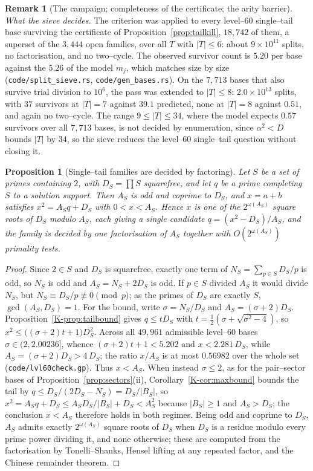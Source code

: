 \documentclass[11pt]{article}
\newtheorem{proposition}[theorem]{Proposition}
\theoremstyle{definition}
\newtheorem{remark}[theorem]{Remark}
\begin{document}
\begin{remark}[The campaign; completeness of the certificate; the arity barrier]
\emph{What the sieve decides.} The criterion was applied to every level--$60$ single--tail base surviving the certificate of
Proposition~\ref{prop:tailkill}, $18{,}742$ of them, a superset of the $3{,}444$ open families, over
all $T$ with $|T|\le6$: about $9\times10^{11}$ splits, no factorisation, and no two--cycle. The
observed survivor count is $5.20$ per base against the $5.26$ of the model $m_j$, which matches size by size
\textup{(\texttt{code/split\_sieve.rs}, \texttt{code/gen\_bases.rs})}. On the $7{,}713$ bases that also
survive trial division to $10^{6}$, the pass was extended to $|T|\le8$: $2.0\times10^{13}$ splits,
with $37$ survivors at $|T|=7$ against $39.1$ predicted, none at $|T|=8$ against $0.51$, and again no two--cycle. The range
$9\le|T|\le34$, where the model expects $0.57$ survivors over all $7{,}713$ bases, is not decided by enumeration, since
$\alpha^{2}<D$ bounds $|T|$ by $34$, so the sieve reduces the level--$60$ single--tail question without closing it.


\begin{proposition}[Single--tail families are decided by factoring]\label{prop:lvl60factor}
Let $S$ be a set of primes containing $2$, with $D_S=\prod S$ squarefree, and let $q$ be a prime
completing $S$ to a solution support. Then $A_S$ is odd and coprime to $D_S$, and $x=a+b$ satisfies
$x^2=A_Sq+D_S$ with $0<x<A_S$. Hence $x$ is one of the $2^{\omega(A_S)}$ square roots of $D_S$ modulo
$A_S$, each giving a single candidate $q=(x^2-D_S)/A_S$, and the family is decided by one
factorisation of $A_S$ together with $O(2^{\omega(A_S)})$ primality tests.
\end{proposition}
\begin{proof}
Since $2\in S$ and $D_S$ is squarefree, exactly one term of $N_S=\sum_{p\in S}D_S/p$ is odd, so $N_S$ is
odd and $A_S=N_S+2D_S$ is odd. If $p\in S$ divided $A_S$ it would divide $N_S$, but $N_S\equiv D_S/p
\not\equiv0\pmod p$; as the primes of $D_S$ are exactly $S$, $\gcd(A_S,D_S)=1$. For the bound, write
$\sigma=N_S/D_S$ and $A_S=(\sigma+2)D_S$. Proposition~\ref{K-prop:tailbound} gives $q\le tD_S$ with
$t=\tfrac12(\sigma+\sqrt{\sigma^2-4})$, so $x^2\le\bigl((\sigma+2)t+1\bigr)D_S^2$. Across all
$49{,}961$ admissible level--$60$ bases $\sigma\in(2,2.00236]$, whence $(\sigma+2)t+1<5.202$ and
$x<2.281\,D_S$, while $A_S=(\sigma+2)D_S>4\,D_S$; the ratio $x/A_S$ is at most $0.56982$ over the whole
set \textup{(\texttt{code/lvl60check.gp})}. Thus $x<A_S$. When instead $\sigma\le2$, as for the
pair--sector bases of Proposition~\ref{prop:sectors}(ii), Corollary~\ref{K-cor:maxbound} bounds the tail
by $q\le D_S/(2D_S-N_S)=D_S/|B_S|$, so $x^2=A_Sq+D_S\le A_SD_S/|B_S|+D_S<A_S^2$ because $|B_S|\ge1$ and
$A_S>D_S$; the conclusion $x<A_S$ therefore holds in both regimes. Being odd and coprime to $D_S$,
$A_S$ admits exactly $2^{\omega(A_S)}$ square roots of $D_S$ when $D_S$ is a residue modulo every prime
power dividing it, and none otherwise; these are computed from the factorisation by Tonelli--Shanks,
Hensel lifting at any repeated factor, and the Chinese remainder theorem.
\end{proof}


\end{remark}
\end{document}
